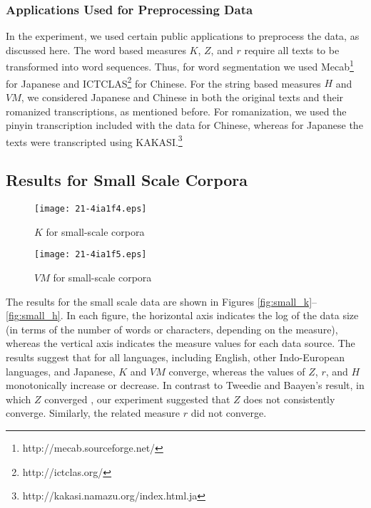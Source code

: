\documentclass[english]{jnlp_1.4_rep}
\begin{document}
\subsubsection{Applications Used for Preprocessing Data}

In the experiment, we used certain public applications to preprocess the data, as discussed here. The word based measures $K$, $Z$, and $r$ require all texts to be transformed into word sequences. Thus, for word segmentation we used Mecab\footnote{http://mecab.sourceforge.net/} for Japanese and ICTCLAS\footnote{http://ictclas.org/} for Chinese. For the string based measures $H$ and $\mathit{VM}$, we considered Japanese and Chinese in both the original texts and their romanized transcriptions, as mentioned before. For romanization, we used the pinyin transcription included with the data for Chinese, whereas for Japanese the texts were transcripted using KAKASI.\footnote{http://kakasi.namazu.org/index.html.ja}


\subsection{Results for Small Scale Corpora}
\label{result_small}

\begin{figure}[b]
\begin{minipage}{0.49\hsize}
\begin{center}
\texttt{[image: 21-4ia1f4.eps]}
\end{center}
\caption{$K$ for small-scale corpora}
\label{fig:small_k}
\end{minipage}
\hfill
\begin{minipage}{0.49\hsize}
\begin{center}
\texttt{[image: 21-4ia1f5.eps]}
\end{center}
\caption{$\mathit{VM}$ for small-scale corpora}
\label{fig:small_v}
\end{minipage}
\end{figure}

The results for the small scale data are shown in Figures \ref{fig:small_k}--\ref{fig:small_h}. In each figure, the horizontal axis indicates the log of the data size (in terms of the number of words or characters, depending on the measure), whereas the vertical axis indicates the measure values for each data source. The results suggest that for all languages, including English, other Indo-European languages, and Japanese, $K$ and $\mathit{VM}$ converge, whereas the values of $Z$, $r$, and $H$ monotonically increase or decrease. In contrast to Tweedie and Baayen's result, in which $Z$ converged \cite{BaayenTweedie}, our experiment suggested that $Z$ does not consistently converge. Similarly, the related measure $r$ did not converge.
\end{document}
